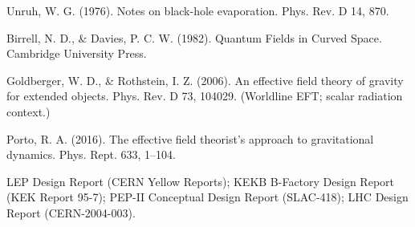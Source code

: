 \documentclass[11pt]{article}
\begin{document}
\medskip
\noindent Unruh, W. G. (1976). Notes on black-hole evaporation. Phys. Rev. D 14, 870.

\noindent Birrell, N. D., \& Davies, P. C. W. (1982). Quantum Fields in Curved Space. Cambridge University Press.

\noindent Goldberger, W. D., \& Rothstein, I. Z. (2006). An effective field theory of gravity for extended objects. Phys. Rev. D 73, 104029. (Worldline EFT; scalar radiation context.)

\noindent Porto, R. A. (2016). The effective field theorist’s approach to gravitational dynamics. Phys. Rept. 633, 1–104.

\noindent LEP Design Report (CERN Yellow Reports); KEKB B-Factory Design Report (KEK Report 95-7); PEP-II Conceptual Design Report (SLAC-418); LHC Design Report (CERN-2004-003).
\end{document}
